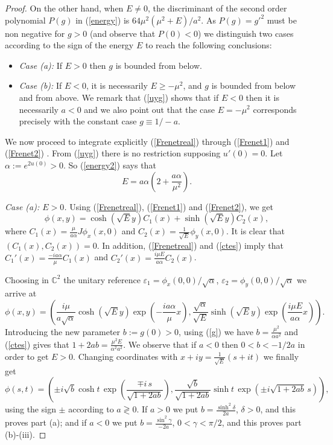 \documentclass[leqno,11pt]{amsart}
\begin{document}
\begin{proof}
On the other hand, when $E\neq 0$, the discriminant of the second
order polynomial $P(g)$ in (\ref{energy}) is
$64\mu^2(\mu^2+E)/a^2$. As $P(g)=g'^2$ must be non negative for
$g>0$ (and observe that $P(0)<0$) we distinguish two cases
according to the sign of the energy $E$ to reach the following
conclusions:
\begin{itemize}
\item
{\em Case (a):} If $E>0$ then $g$ is bounded from below.
\item
{\em Case (b):} If $E<0$, it is necessarily $E\geq -\mu^2$, and
$g$ is bounded from below and from above. We remark that
(\ref{uyg}) shows that if $E<0$ then it is necessarily $a<0$ and
we also point out that the case $E=-\mu^2$ corresponds precisely
with the constant case $g\equiv1/-a$.
\end{itemize}

We now proceed to integrate explicitly (\ref{Frenetreal}) through
(\ref{Frenet1}) and (\ref{Frenet2}) . From (\ref{uyg}) there is no
restriction supposing $u'(0)=0$. Let $\alpha:=e^{2u(0)}>0$. So
(\ref{energy2}) says that
\begin{equation}\label{ctes}
E=a \alpha \left(2 +\frac{a\alpha}{\mu^2} \right).
\end{equation}

{\em Case (a): $E>0$.} Using (\ref{Frenetreal}), (\ref{Frenet1})
and (\ref{Frenet2}), we get
$$ \phi(x,y)= \cosh (\sqrt{E}y)C_1(x) + \sinh (\sqrt{E}y)C_2(x),$$
where  $C_1(x)=\frac{\mu}{a \alpha}J\phi_x(x,0)$ and
$C_2(x)=\frac{1}{\sqrt E}\phi_y(x,0)$. It is clear that
$(C_1(x),C_2(x))=0$. In addition, (\ref{Frenetreal}) and
(\ref{ctes}) imply that $C_1'(x)=\frac{-ia\alpha}{\mu}C_1(x)$ and
$C_2'(x)=\frac{i \mu E}{a \alpha}C_2(x)$.

Choosing in ${\mathbb{C}}^2$ the unitary reference $\varepsilon_1 =
\phi_x(0,0)/\sqrt \alpha$, $\varepsilon_2 = \phi_y(0,0)/\sqrt
\alpha$ we arrive at
$$ \phi (x,y)=\left(  \frac{i\mu}{a \sqrt{\alpha}} \cosh (\sqrt{E}y) \exp \left(-\frac{i a \alpha}{\mu}x\right),
\frac{\sqrt{\alpha}}{\sqrt E} \sinh (\sqrt{E}y) \exp \left(\frac{i
\mu E}{a \alpha }x\right)\right). $$ Introducing the new parameter
$b:=g(0)>0$, using (\ref{g}) we have $b=\frac{\mu^2}{\alpha a^2}$
and (\ref{ctes}) gives that $1+2ab = \frac{\mu^2 E}{\alpha^2
a^2}$. We observe that if $a<0$ then $0<b<-1/2a$ in order to get
$E>0$. Changing coordinates with $x+iy=\frac{1}{\sqrt E}(s+it)$ we
finally get
$$ \phi(s,t)=\left( \pm i\sqrt{b}\cosh t\,\exp\left(\frac{\mp i\,s}{\sqrt{1+2ab}}\right),
\frac{\sqrt{b}}{\sqrt{1+2ab}}\sinh t\,\exp\left(\pm
i\sqrt{1+2ab}\,s\right)\right),
$$
using the sign $\pm $ according to $a\gtrless 0$. If $a>0$ we put
$b=\frac{\sinh^2 \delta}{2a}$, $\delta
>0$, and this proves part (a); and if $a<0$ we put $b=\frac{\sin^2
\gamma}{-2a}$, $0<\gamma <\pi/2$, and this proves part (b)-(iii).


\end{proof}
\end{document}
